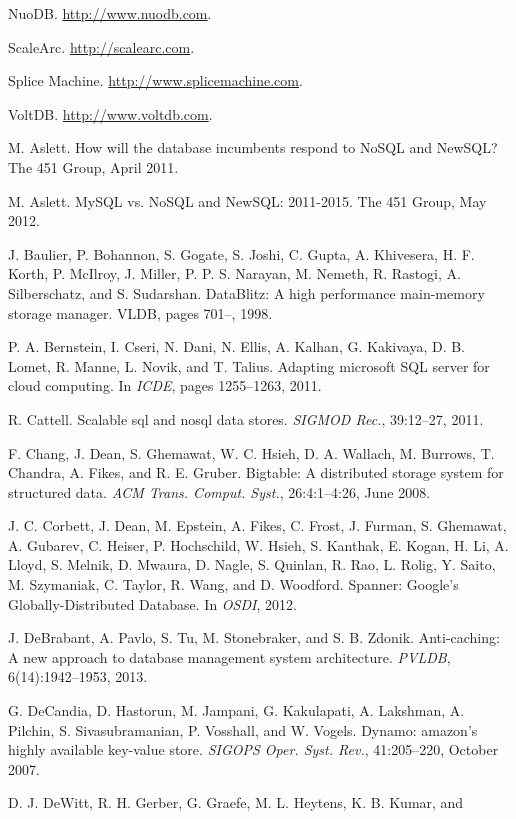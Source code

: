 \documentclass[a4paper,11pt,twoside,openright]{article}
\begin{document}
\begin{enumerate}[label={[}\arabic*{]}]
\item NuoDB. \url{http://www.nuodb.com}.
\item ScaleArc. \url{http://scalearc.com}.
\item
  Splice Machine. \url{http://www.splicemachine.com}.
\item
  VoltDB. \url{http://www.voltdb.com}.
\item
  M. Aslett. How will the database incumbents respond to NoSQL and
  NewSQL? The 451 Group, April 2011.
\item
  M. Aslett. MySQL vs. NoSQL and NewSQL:
2011-2015. The 451 Group, May 2012.
\item
  J. Baulier, P. Bohannon, S. Gogate, S. Joshi, C. Gupta, A. Khivesera,
  H. F. Korth, P. McIlroy, J. Miller, P. P. S.
Narayan, M. Nemeth, R. Rastogi, A. Silberschatz, and S. Sudarshan.
DataBlitz: A high performance main-memory storage manager. VLDB, pages
701--, 1998.
\item
  P. A. Bernstein, I. Cseri, N. Dani, N. Ellis, A. Kalhan,
G. Kakivaya, D. B. Lomet, R. Manne, L. Novik, and T. Talius. Adapting
microsoft SQL server for cloud computing. In \emph{ICDE}, pages
1255--1263, 2011.
\item
  R. Cattell. Scalable sql and nosql data stores. \emph{SIGMOD Rec.},
  39:12--27, 2011.
\item
  F. Chang, J. Dean, S. Ghemawat, W. C. Hsieh, D. A.
Wallach, M. Burrows, T. Chandra, A. Fikes, and R. E. Gruber. Bigtable: A
distributed storage system for structured data. \emph{ACM Trans. Comput.
Syst.}, 26:4:1--4:26, June 2008.
\item
  J. C. Corbett, J. Dean, M. Epstein, A. Fikes, C. Frost,
J. Furman, S. Ghemawat, A. Gubarev, C. Heiser,
P. Hochschild, W. Hsieh, S. Kanthak, E. Kogan, H. Li,
A. Lloyd, S. Melnik, D. Mwaura, D. Nagle, S. Quinlan,
R. Rao, L. Rolig, Y. Saito, M. Szymaniak, C. Taylor, R. Wang, and D.
Woodford. Spanner: Google's Globally-Distributed Database. In
\emph{OSDI}, 2012.
\item
  J. DeBrabant, A. Pavlo, S. Tu, M. Stonebraker, and S. B. Zdonik.
  Anti-caching: A new approach to database management system
  architecture. \emph{PVLDB}, 6(14):1942--1953, 2013.
\item
  G. DeCandia, D. Hastorun, M. Jampani, G. Kakulapati,
A. Lakshman, A. Pilchin, S. Sivasubramanian, P. Vosshall, and W. Vogels.
Dynamo: amazon's highly available key-value store. \emph{SIGOPS Oper.
Syst. Rev.}, 41:205--220, October 2007.
\item
  D. J. DeWitt, R. H. Gerber, G. Graefe, M. L. Heytens, K. B. Kumar, and

\end{enumerate}
\end{document}
